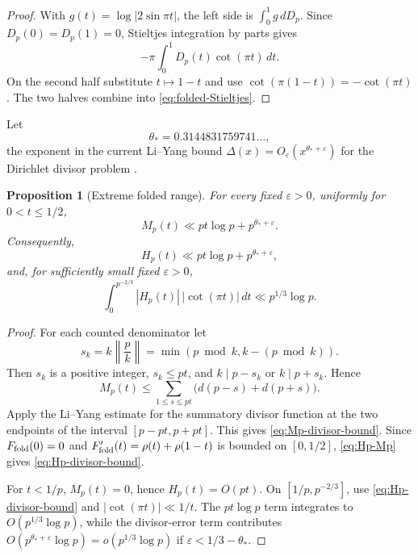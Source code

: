 \documentclass[11pt]{amsart}
\numberwithin{equation}{section}
\newtheorem{proposition}[theorem]{Proposition}
\theoremstyle{definition}
\theoremstyle{remark}
\newcommand{\eps}{\varepsilon}
\begin{document}
\begin{proof}
With \(g(t)=\log|2\sin\pi t|\), the left side is
\(\int_0^1 g\,dD_p\).  Since \(D_p(0)=D_p(1)=0\), Stieltjes integration
by parts gives
\[
 -\pi\int_0^1D_p(t)\cot(\pi t)\,dt.
\]
On the second half substitute \(t\mapsto1-t\) and use
\(\cot(\pi(1-t))=-\cot(\pi t)\).  The two halves combine into
\eqref{eq:folded-Stieltjes}.
\end{proof}

Let
\begin{equation}\label{eq:theta-star}
 \theta_*=0.3144831759741\ldots,
\end{equation}
the exponent in the current Li--Yang bound
\(\Delta(x)=O_\eps(x^{\theta_*+\eps})\) for the Dirichlet divisor problem
\cite{LiYang2023}.

\begin{proposition}[Extreme folded range]\label{prop:extreme-folded-range}
For every fixed \(\eps>0\), uniformly for \(0<t\le1/2\),
\begin{equation}\label{eq:Mp-divisor-bound}
 M_p(t)\ll pt\log p+p^{\theta_*+\eps}.
\end{equation}
Consequently,
\begin{equation}\label{eq:Hp-divisor-bound}
 H_p(t)\ll pt\log p+p^{\theta_*+\eps},
\end{equation}
and, for sufficiently small fixed \(\eps>0\),
\begin{equation}\label{eq:extreme-integral}
 \int_0^{p^{-2/3}}|H_p(t)|\,|\cot(\pi t)|\,dt
 \ll p^{1/3}\log p.
\end{equation}
\end{proposition}

\begin{proof}
For each counted denominator let
\[
 s_k=k\left\|\frac pk\right\|=\min(p\bmod k,k-(p\bmod k)).
\]
Then \(s_k\) is a positive integer, \(s_k\le pt\), and
\(k\mid p-s_k\) or \(k\mid p+s_k\).  Hence
\[
 M_p(t)\le\sum_{1\le s\le pt}\bigl(d(p-s)+d(p+s)\bigr).
\]
Apply the Li--Yang estimate for the summatory divisor function at the two
endpoints of the interval \([p-pt,p+pt]\).  This gives
\eqref{eq:Mp-divisor-bound}.  Since \(F_{\rm fold}(0)=0\) and
\(F_{\rm fold}'(t)=\rho(t)+\rho(1-t)\) is bounded on \([0,1/2]\),
\eqref{eq:Hp-Mp} gives \eqref{eq:Hp-divisor-bound}.

For \(t<1/p\), \(M_p(t)=0\), hence \(H_p(t)=O(pt)\).  On
\([1/p,p^{-2/3}]\), use \eqref{eq:Hp-divisor-bound} and
\(|\cot(\pi t)|\ll1/t\).  The \(pt\log p\) term integrates to
\(O(p^{1/3}\log p)\), while the divisor-error term contributes
\(O(p^{\theta_*+\eps}\log p)=o(p^{1/3}\log p)\) if
\(\eps<1/3-\theta_*\).
\end{proof}
\end{document}
